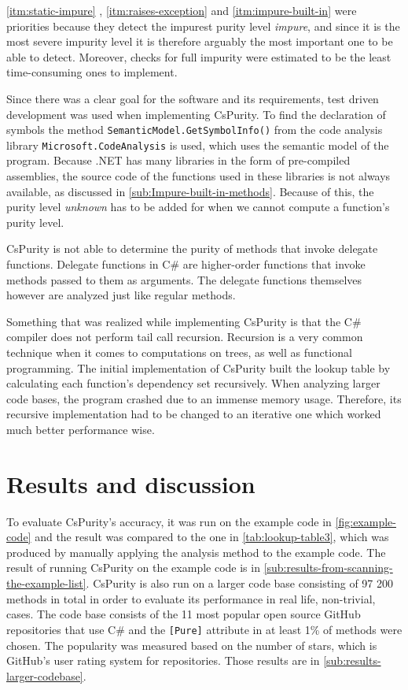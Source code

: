 \documentclass[a4paper,12pt]{article}
\newcommand{\Autoref}[1]{%
  \begingroup%
  \def\chapterautorefname{Chapter}%
  \def\sectionautorefname{Section}%
  \def\subsectionautorefname{Subsection}%
  \def\itemautorefname{Item}%
  \autoref{#1}%
  \endgroup%
}
\begin{document}
\Autoref{itm:static-impure}, \ref{itm:raises-exception} and \ref{itm:impure-built-in} were priorities because they detect the impurest purity level \textit{impure}, and since it is the most severe impurity level it is therefore arguably the most important one to be able to detect. Moreover, checks for full impurity were estimated to be the least time-consuming ones to implement.

Since there was a clear goal for the software and its requirements, test driven development was used when implementing CsPurity. To find the declaration of symbols the method \texttt{SemanticModel.GetSymbolInfo()} from the code analysis library \texttt{Microsoft.CodeAnalysis} is used, which uses the semantic model of the program. Because .NET has many libraries in the form of pre-compiled assemblies, the source code of the functions used in these libraries is not always available, as discussed in \autoref{sub:Impure-built-in-methods}. Because of this, the purity level \textit{unknown} has to be added for when we cannot compute a function's purity level.

CsPurity is not able to determine the purity of methods that invoke delegate functions. Delegate functions in C\# are higher-order functions that invoke methods passed to them as arguments. The delegate functions themselves however are analyzed just like regular methods.

Something that was realized while implementing CsPurity is that the C\# compiler does not perform tail call recursion. Recursion is a very common technique when it comes to computations on trees, as well as functional programming. The initial implementation of CsPurity built the lookup table by calculating each function's dependency set recursively. When analyzing larger code bases, the program crashed due to an immense memory usage. Therefore, its recursive implementation had to be changed to an iterative one which worked much better performance wise.

\section{Results and discussion} \label{sec:results-and-discussion}

To evaluate CsPurity's accuracy, it was run on the example code in \autoref{fig:example-code} and the result was compared to the one in \autoref{tab:lookup-table3}, which was produced by manually applying the analysis method to the example code. The result of running CsPurity on the example code is in \autoref{sub:results-from-scanning-the-example-list}. CsPurity is also run on a larger code base consisting of 97 200 methods in total in order to evaluate its performance in real life, non-trivial, cases. The code base consists of the 11 most popular open source GitHub repositories that use C\# and the \texttt{[Pure]} attribute in at least 1\% of methods were chosen. The popularity was measured based on the number of stars, which is GitHub's user rating system for repositories. Those results are in \autoref{sub:results-larger-codebase}.
\end{document}
